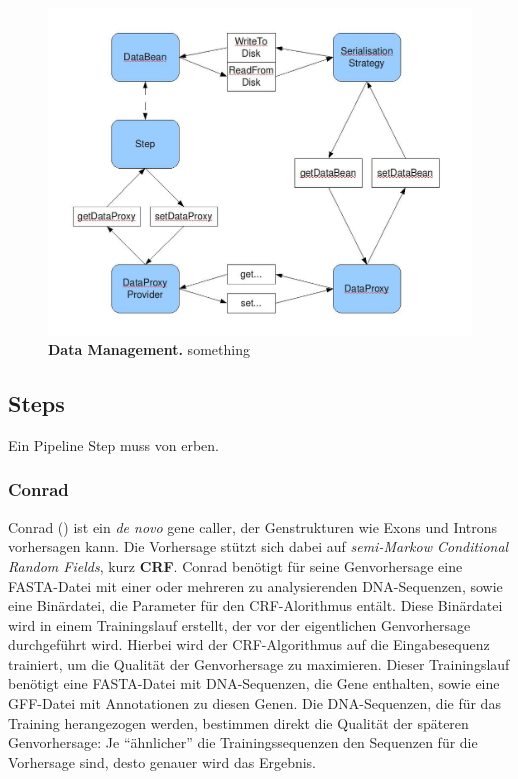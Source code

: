 \begin{figure}[ht]
	\begin{center}
		\includegraphics[scale=0.42]{pics/programDataManagment.jpg}
	\caption[Data Management]{
	\textbf{Data Management.}
	something}
	\end{center}
	\label{fig:programDataManagment}
\end{figure}

\subsection{Steps}
Ein Pipeline Step muss von  erben.
\subsubsection{Conrad}
Conrad
()
ist ein \textit{de novo} gene caller, der Genstrukturen wie Exons und Introns
vorhersagen kann.
 
Die Vorhersage stützt sich dabei auf \textit{semi-Markow Conditional Random
Fields}, kurz \textbf{CRF}.  %
  
Conrad benötigt für seine Genvorhersage eine FASTA-Datei mit einer oder
mehreren zu analysierenden DNA-Sequenzen, sowie eine Binärdatei, die Parameter
für den CRF-Alorithmus entält.
Diese Binärdatei wird in einem Trainingslauf erstellt, der vor der
eigentlichen Genvorhersage durchgeführt wird. Hierbei wird der CRF-Algorithmus
auf die Eingabesequenz trainiert, um die Qualität der Genvorhersage
zu maximieren. Dieser Trainingslauf benötigt eine FASTA-Datei mit
DNA-Sequenzen, die Gene enthalten, sowie eine GFF-Datei mit Annotationen zu
diesen Genen.
Die DNA-Sequenzen, die für das Training herangezogen werden, bestimmen direkt
die Qualität der späteren Genvorhersage:
Je \enquote{ähnlicher} die Trainingssequenzen den Sequenzen für die
Vorhersage sind, desto genauer wird das Ergebnis.
\citep{doherty_gene_2007}

